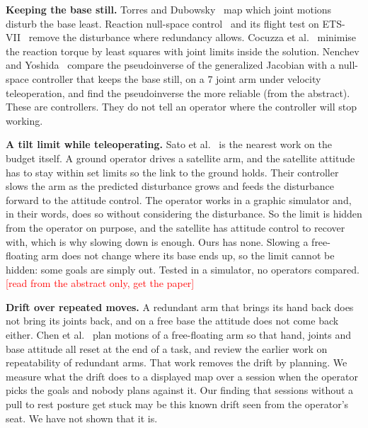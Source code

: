 \documentclass[pdflatex,sn-mathphys-num]{sn-jnl}
\newcommand{\todo}[1]{\textcolor{red}{[#1]}}
\begin{document}
\textbf{Keeping the base still.} Torres and Dubowsky~\cite{torres1992} map which joint motions disturb the base
least. Reaction null-space control~\cite{nenchev1999} and its flight test on ETS-VII~\cite{yoshida2001} remove the
disturbance where redundancy allows. Cocuzza et al.~\cite{cocuzza2011} minimise the reaction torque by least
squares with joint limits inside the solution. Nenchev and Yoshida~\cite{nenchev1999gnc} compare the pseudoinverse
of the generalized Jacobian with a null-space controller that keeps the base still, on a 7 joint arm under
velocity teleoperation, and find the pseudoinverse the more reliable (from the abstract). These are
controllers. They do not
tell an operator where the controller will stop working.

\textbf{A tilt limit while teleoperating.} Sato et al.~\cite{sato1993} is the nearest work on the budget itself.
A ground operator drives a satellite arm, and the satellite attitude has to stay within set limits so the link to
the ground holds. Their controller slows the arm as the predicted disturbance grows and feeds the disturbance
forward to the attitude control. The operator works in a graphic simulator and, in their words, does so without
considering the disturbance. So the limit is hidden from the operator on purpose, and the satellite has attitude
control to recover with, which is why slowing down is enough. Ours has none. Slowing a free-floating arm does not
change where its base ends up, so the limit cannot be hidden: some goals are simply out. Tested in a simulator,
no operators compared. \todo{read from the abstract only, get the paper}

\textbf{Drift over repeated moves.} A redundant arm that brings its hand back does not bring its joints back,
and on a free base the attitude does not come back either. Chen et al.~\cite{chen2013} plan motions of a
free-floating arm so that hand, joints and base attitude all reset at the end of a task, and review the earlier
work on repeatability of redundant arms. That work removes the drift by planning. We measure what the drift does
to a displayed map over a session when the operator picks the goals and nobody plans against it. Our finding
that sessions without a pull to rest posture get stuck may be this known drift seen from the operator's seat.
We have not shown that it is.
\end{document}
